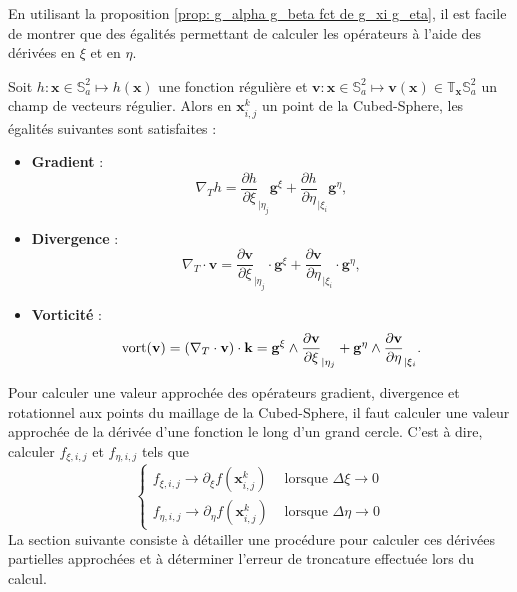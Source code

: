 En utilisant la proposition \ref{prop: g_alpha g_beta fct de g_xi g_eta}, il est facile de montrer que des égalités permettant de calculer les opérateurs à l'aide des dérivées en $\xi$ et en $\eta$.

\begin{theoreme}
Soit $h : \mathbf{x} \in \mathbb{S}_a^2 \mapsto h(\mathbf{x})$ une fonction régulière et $\mathbf{v} : \mathbf{x} \in \mathbb{S}_a^2 \mapsto \mathbf{v}(\mathbf{x}) \in \mathbb{T}_{\mathbf{x}} \mathbb{S}_a^2$ un champ de vecteurs régulier. Alors en $\mathbf{x}_{i,j}^k$ un point de la Cubed-Sphere, les égalités suivantes sont satisfaites :
\begin{itemize}
\item \textbf{Gradient} :
\begin{equation}
\nabla_T h = \dfrac{\partial h}{\partial \xi}_{|\eta_j} \mathbf{g}^{\xi} + \dfrac{\partial h}{\partial \eta}_{|\xi_i} \mathbf{g}^{\eta},
\end{equation}

\item \textbf{Divergence} :
\begin{equation}
\nabla_T \cdot \mathbf{v} = \dfrac{\partial \mathbf{v}}{\partial \xi}_{|\eta_j} \cdot \mathbf{g}^{\xi} + \dfrac{\partial \mathbf{v}}{\partial \eta}_{|\xi_i} \cdot \mathbf{g}^{\eta},
\label{eq:divergence_v1}
\end{equation}

\item \textbf{Vorticité} :
\begin{equation}
\text{vort}( \mathbf{v} ) = \left( \nabla_T \cdot \mathbf{v} \right) \cdot \mathbf{k} = \mathbf{g}^{\xi} \wedge \dfrac{\partial \mathbf{v}}{\partial \xi}_{|\eta_j} + \mathbf{g}^{\eta} \wedge \dfrac{\partial \mathbf{v}}{\partial \eta}_{|\xi_i}.
\end{equation}
\end{itemize} 
\end{theoreme}

Pour calculer une valeur approchée des opérateurs gradient, divergence et rotationnel aux points du maillage de la Cubed-Sphere, il faut calculer une valeur approchée de la dérivée d'une fonction le long d'un grand cercle. C'est à dire, calculer $f_{\xi,i,j}$ et $f_{\eta,i,j}$ tels que 
\begin{equation}
\left\lbrace
\begin{array}{rl}
f_{\xi,i,j} \rightarrow \partial_{\xi} f ( \mathbf{x}_{i,j}^k) & \text{ lorsque } \Delta \xi \rightarrow 0\\
f_{\eta,i,j} \rightarrow \partial_{\eta} f ( \mathbf{x}_{i,j}^k) & \text{ lorsque } \Delta \eta \rightarrow 0
\end{array}
\right.
\end{equation}
La section suivante consiste à détailler une procédure pour calculer ces dérivées partielles approchées et à déterminer l'erreur de troncature effectuée lors du calcul.





